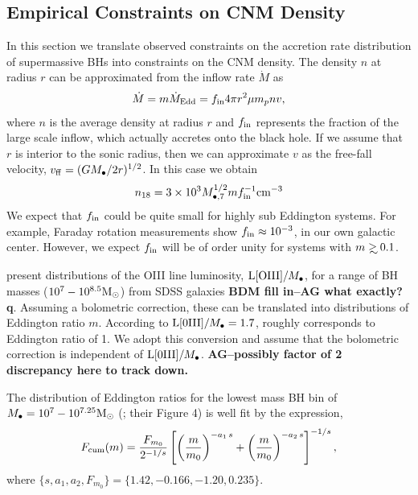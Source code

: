 \documentclass[usenatbib,fleqn]{mnras}
\newcommand\gsim{\mathrel{\rlap{\lower4pt\hbox{\hskip1pt$\sim$}}
    \raise1pt\hbox{$>$}}}
\newcommand{\Mbh}[1][]{M_{\bullet#1}}
\newcommand{\Msun}{{\rm M_\odot}}
\begin{document}
\subsection{Empirical Constraints on CNM Density}

In this section we translate observed constraints on the accretion
rate distribution of supermassive BHs into constraints on the CNM
density.  The density $n$ at radius $r$ can be approximated from the
inflow rate $\dot{M}$ as
\begin{equation}
\dot{M} = m \dot{M}_{\rm Edd}= f_{\rm in} 4 \pi r^2 \mu m_p n v,
\label{eq:mdot}
\end{equation}
where $n$ is the average density at radius $r$ and $f_{\rm in}$
represents the fraction of the large scale inflow, which actually
accretes onto the black hole.  If we assume that $r$ is interior to
the sonic radius, then we can approximate $v$ as the free-fall
velocity, $v_{\rm ff} = (GM_{\bullet}/2r)^{1/2}$.  In this case we
obtain
\begin{equation}
n_{18} = 3 \times 10^3 M_{\bullet,7}^{1/2} m f_{\rm in}^{-1} {\rm
  cm}^{-3}
\label{eq:n18Edd}
\end{equation}
We expect that $f_{\rm in}$ could be quite small for highly sub
Eddington systems. For example, Faraday rotation measurements
\citep{Quataert+2000} show $f_{\rm in}\approx 10^{-3}$, in our own
galactic center. However, we expect $f_{\rm in}$ will be of order
unity for systems with $m\gsim 0.1$.  

\citet{Kauffmann+2009} present distributions of the OIII line
luminosity, ${\rm L[OIII]}/\Mbh$, for a range of BH masses
($10^7-10^{8.5} \Msun$) from SDSS galaxies {\bf BDM fill in--AG what
  exactly?q}.  Assuming a bolometric correction, these can be
translated into distributions of Eddington ratio $m$.  According to
\citet{Kauffmann+2009} ${\rm L[0III]}/\Mbh=1.7$, roughly corresponds
to Eddington ratio of 1. We adopt this conversion and assume that the
bolometric correction is independent of ${\rm L[0III]}/\Mbh$. {\bf
  AG--possibly factor of 2 discrepancy here to track down.}

The distribution of Eddington ratios for the lowest mass BH bin of
$M_{\bullet} = 10^7 - 10^{7.25} \Msun$ (\citealt{Kauffmann+2009};
their Figure 4) is well fit by the expression,
\begin{align}
  F_{\rm cum}(m)=\frac{F_{m_0}}{2^{-1/s}}
  \left[\left(\frac{m}{m_0}\right)^{-a_1\,
      s}+\left(\frac{m}{m_0}\right)^{-a_2 \, s}\right]^{-1/s} \label{eq:khFit},
\end{align}
where $\{s, a_1, a_2, F_{m_0}\} =\{1.42, -0.166, -1.20, 0.235\}$.
\end{document}
